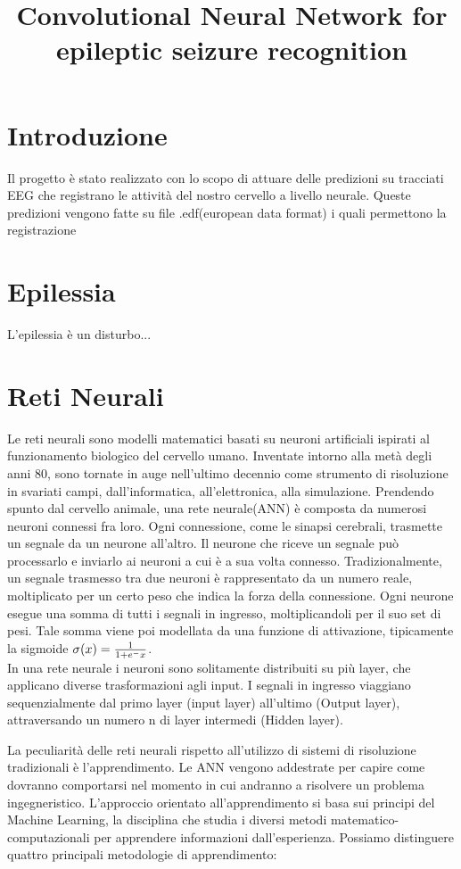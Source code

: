 \documentclass{article}
\begin{document}
\title{Convolutional Neural Network for epileptic seizure recognition}
\maketitle

\tableofcontents

\section*{Introduzione}
Il progetto è stato realizzato con lo scopo di attuare delle predizioni su tracciati EEG che registrano le attività del nostro cervello a livello neurale.
Queste predizioni vengono fatte su file .edf(european data format) i quali permettono la registrazione 
\section{Epilessia}
L'epilessia è un disturbo... 
\section{Reti Neurali}
Le reti neurali sono modelli matematici basati su neuroni artificiali ispirati al funzionamento biologico del cervello umano. Inventate intorno alla metà degli anni 80, sono tornate in auge nell'ultimo decennio come strumento di risoluzione in svariati campi, dall'informatica, all'elettronica, alla simulazione. 
Prendendo spunto dal cervello animale, una rete neurale(ANN) è composta da numerosi neuroni connessi fra loro. Ogni connessione, come le sinapsi cerebrali, trasmette un segnale da un neurone all'altro. Il neurone che riceve un segnale può processarlo e inviarlo ai neuroni a cui è a sua volta connesso. Tradizionalmente, un segnale trasmesso tra due neuroni è rappresentato da un numero reale, moltiplicato per un certo peso che indica la forza della connessione. Ogni neurone esegue una somma di tutti i segnali in ingresso, moltiplicandoli per il suo set di pesi. Tale somma viene poi modellata da una funzione di attivazione, tipicamente la sigmoide
$\sigma(x) = {1 \over 1+e^-x}$.\\
In una rete neurale i neuroni sono solitamente distribuiti su più layer, che applicano diverse trasformazioni agli input. I segnali in ingresso viaggiano sequenzialmente dal primo layer (input layer) all'ultimo (Output layer), attraversando un numero n di layer intermedi (Hidden layer).

La peculiarità delle reti neurali rispetto all'utilizzo di sistemi di risoluzione tradizionali è l'apprendimento. Le ANN vengono addestrate per capire come dovranno comportarsi nel momento in cui andranno a risolvere un problema ingegneristico. L'approccio orientato all'apprendimento si basa sui principi del Machine Learning, la disciplina che studia i diversi metodi matematico-computazionali per apprendere informazioni dall'esperienza. Possiamo distinguere quattro principali metodologie di apprendimento:
\end{document}
